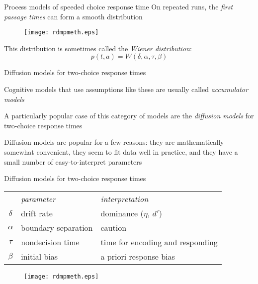 \documentclass[aspectratio=169]{beamer}
\begin{document}
\begin{frame}[fragile]{Process models of speeded choice response time}
On repeated runs, the \emph{first passage times} can form a smooth distribution
\begin{figure}[htp]
\centering\vspace{-2ex}
{\texttt{[image: rdmpmeth.eps]}}
\end{figure}
This distribution is sometimes called the \emph{Wiener distribution}:
$$p(t, a) = W(\delta,\alpha,\tau,\beta)$$
\end{frame}


\begin{frame}[fragile]{Diffusion models for two-choice response times}

Cognitive models that use assumptions like these are usually called \emph{accumulator models}\pause

A particularly popular case of this category of models are the \emph{diffusion models} for two-choice response times\pause

Diffusion models are popular for a few reasons: they are mathematically somewhat convenient, they seem to fit data well in practice, and they have a small number of easy-to-interpret parameters

\end{frame}


\begin{frame}[fragile]{Diffusion models for two-choice response times}\centering
\begin{tabular}{cll}
\rowcolor{black}
           & {\it\color{white}parameter} &  {\it\color{white}interpretation} \\
\rowcolor{verylightgray}
$\delta$   &  drift rate              &  dominance ($\eta$, $d'$) \\
\rowcolor{lightgray}
$\alpha$   &  boundary separation     &  caution \\
\rowcolor{verylightgray}
$\tau$     &  nondecision time        &  time for encoding and responding \\
\rowcolor{lightgray}
$\beta$    &  initial bias            &  a priori response bias \\
\end{tabular}

\begin{figure}[htp]
\centering\vspace{-2ex}
{\texttt{[image: rdmpmeth.eps]}}
\end{figure}
\end{frame}
\end{document}

